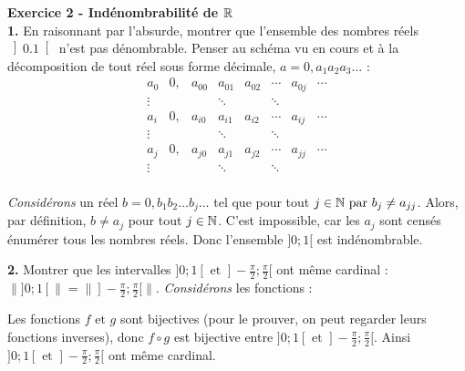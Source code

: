     \hspace*{-2.65cm}\textbf{Exercice 2 - Indénombrabilité de \(\mathbb{R}\)}\\
    \hspace*{-1.5em}\textbf{1.} En raisonnant par l'absurde, montrer que l'ensemble des nombres réels \(\left]0.1\right[\) n'est pas dénombrable. Penser au schéma vu en cours et à la décomposition de tout réel sous forme décimale, \(a=0,a_1a_2a_3\dots\) :
    \[
    \begin{array}{c|ccccccc}
        a_0 &0, &a_{00} &a_{01} &a_{02} &\cdots & a_{0j} & \cdots\\
        \vdots& & & \ddots & & \ddots & & \\
        a_i & 0, &a_{i0} & a_{i1} & a_{i2} & \cdots & a_{ij} & \cdots\\
        \vdots& & & \ddots & & \ddots & & \\
        a_j & 0, &a_{j0} & a_{j1} & a_{j2} & \cdots & a_{jj} & \cdots\\
        \vdots& & & \ddots & & \ddots & & \\
    \end{array}
    \]
    \noindent\makebox[\linewidth]{\rule{\linewidth}{0.4pt}}

    \emph{Considérons} un réel \(b=0,b_1b_2\dots b_j\dots\) tel que pour tout \(j\in\mathbb{N} \text{ par } b_j\neq a_{jj}\). Alors, par définition, \(b\neq a_{j}\) pour tout \(j\in\mathbb{N}\). C'est impossible, car les \(a_j\) sont censés énumérer tous les nombres réels. Donc l'ensemble \(]0;1[\) est indénombrable.

    \hspace*{-1.5em}\textbf{2.} Montrer que les intervalles \(]0;1[\text{ et }]-\frac{\pi}{2};\frac{\pi}{2}[\) ont même cardinal : \(\|]0;1[\|=\|]-\frac{\pi}{2};\frac{\pi}{2}[\|\).
    \noindent\makebox[\linewidth]{\rule{\linewidth}{0.4pt}}
    \emph{Considérons} les fonctions :
    \begin{flalign}
        f&\colon\left]-;;\pi{};\pi{};1;1[]-;[\). Ainsi \(]0;1[\text{ et }]-\frac{\pi}{2};\frac{\pi}{2}[\) ont même cardinal.

